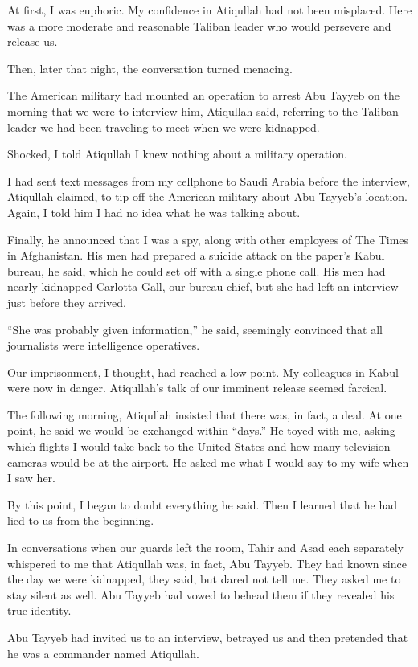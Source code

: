 ﻿\documentclass[12pt]{article}
\begin{document}
At first, I was euphoric. My confidence in Atiqullah had not been misplaced. Here was a more
moderate and reasonable Taliban leader who would persevere and release us.

Then, later that night, the conversation turned menacing.

The American military had mounted an operation to arrest Abu Tayyeb on the morning that we were to
interview him, Atiqullah said, referring to the Taliban leader we had been traveling to meet when we
were kidnapped.

Shocked, I told Atiqullah I knew nothing about a military operation.

I had sent text messages from my cellphone to Saudi Arabia before the interview, Atiqullah claimed,
to tip off the American military about Abu Tayyeb's location. Again, I told him I had no idea what
he was talking about.

Finally, he announced that I was a spy, along with other employees of The Times in Afghanistan. His
men had prepared a suicide attack on the paper's Kabul bureau, he said, which he could set off with
a single phone call. His men had nearly kidnapped Carlotta Gall, our bureau chief, but she had left
an interview just before they arrived.

``She was probably given information,'' he said, seemingly convinced that all journalists were
intelligence operatives.

Our imprisonment, I thought, had reached a low point. My colleagues in Kabul were now in danger.
Atiqullah's talk of our imminent release seemed farcical\cite{farcical}.

The following morning, Atiqullah insisted that there was, in fact, a deal. At one point, he said we
would be exchanged within ``days.'' He toyed with me, asking which flights I would take back to the
United States and how many television cameras would be at the airport. He asked me what I would say
to my wife when I saw her.

By this point, I began to doubt everything he said. Then I learned that he had lied to us from the
beginning.

In conversations when our guards left the room, Tahir and Asad each separately whispered to me that
Atiqullah was, in fact, Abu Tayyeb. They had known since the day we were kidnapped, they said, but
dared not tell me. They asked me to stay silent as well. Abu Tayyeb had vowed to behead them if they
revealed his true identity.

Abu Tayyeb had invited us to an interview, betrayed us and then pretended that he was a commander
named Atiqullah.
\end{document}
